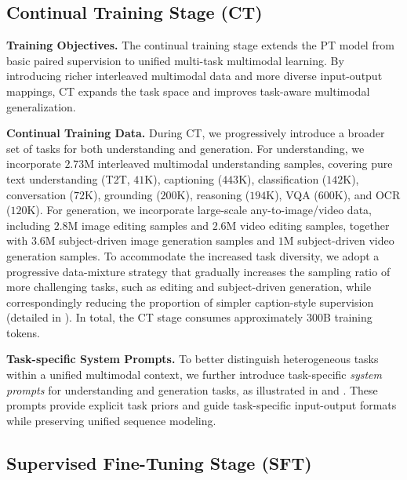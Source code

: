 \subsection{Continual Training Stage (CT)}

\textbf{Training Objectives.}
The continual training stage extends the PT model from basic paired supervision to unified multi-task multimodal learning. By introducing richer interleaved multimodal data and more diverse input-output mappings, CT expands the task space and improves task-aware multimodal generalization.



\textbf{Continual Training Data.}
During CT, we progressively introduce a broader set of tasks for both understanding and generation. For understanding, we incorporate $2.73$M interleaved multimodal understanding samples, covering pure text understanding (T2T, $41$K), captioning ($443$K), classification ($142$K), conversation ($72$K), grounding ($200$K), reasoning ($194$K), VQA ($600$K), and OCR ($120$K). For generation, we incorporate large-scale any-to-image/video data, including $2.8$M image editing samples and $2.6$M video editing samples, together with $3.6$M subject-driven image generation samples and $1$M subject-driven video generation samples. To accommodate the increased task diversity, we adopt a progressive data-mixture strategy that gradually increases the sampling ratio of more challenging tasks, such as editing and subject-driven generation, while correspondingly reducing the proportion of simpler caption-style supervision (detailed in ). In total, the CT stage consumes approximately $300$B training tokens.


\textbf{Task-specific System Prompts.}
To better distinguish heterogeneous tasks within a unified multimodal context, we further introduce task-specific \textit{system prompts} for understanding and generation tasks, as illustrated in  and . These prompts provide explicit task priors and guide task-specific input-output formats while preserving unified sequence modeling.










\subsection{Supervised Fine-Tuning Stage (SFT)}


